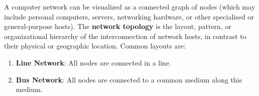 \documentclass[a4paper, 12pt]{report}
\theoremstyle{remark}
\theoremstyle{definition}
\begin{document}
A computer network can be visualized as a connected graph of nodes (which may include personal computers, servers, networking hardware, or other specialised or general-purpose hosts). The \textbf{network topology} is the layout, pattern, or organizational hierarchy of the interconnection of network hosts, in contrast to their physical or geographic location. Common layouts are: 
\begin{enumerate}
    \item \textbf{Line Network}: All nodes are connected in a line. 
\begin{center}
\end{center}
    \item \textbf{Bus Network}: All nodes are connected to a common medium along this medium. 


\end{enumerate}
\end{document}
